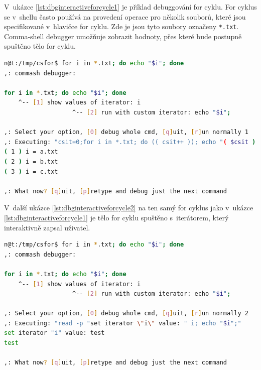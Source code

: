 \documentclass[thesis=M,czech]{FITthesis}[2012/06/26]
\begin{document}
V~ukázce \ref{lst:dbginteractiveforcycle1} je příklad debuggování for cyklu. For cyklus se v~shellu často používá na provedení operace pro několik souborů, které jsou specifikované v~hlavičce for cyklu. Zde je jsou tyto soubory označeny \texttt{*.txt}. Comma-shell debugger umožňuje zobrazit hodnoty, přes které bude postupně spuštěno tělo for cyklu.

\begin{minipage}{\linewidth}
\begin{lstlisting}[language=bash, caption={Debugger interaktivního shellu - výpis hodnot iterátoru for cyklu }, label={lst:dbginteractiveforcycle1}]
n@t:/tmp/csfor$ for i in *.txt; do echo "$i"; done
,: commash debugger:

for i in *.txt; do echo "$i"; done
    ^-- [1] show values of iterator: i
                   ^-- [2] run with custom iterator: echo "$i";

,: Select your option, [0] debug whole cmd, [q]uit, [r]un normally 1
,: Executing: "csit=0;for i in *.txt; do (( csit++ )); echo "( $csit ) i = $i"; done"
( 1 ) i = a.txt
( 2 ) i = b.txt
( 3 ) i = c.txt

,: What now? [q]uit, [p]retype and debug just the next command
\end{lstlisting}
\end{minipage}

V~další ukázce \ref{lst:dbginteractiveforcycle2} na ten samý for cyklus jako v~ukázce \ref{lst:dbginteractiveforcycle1} je tělo for cyklu spuštěno s~iterátorem, který interaktivně zapsal uživatel.

\begin{minipage}{\linewidth}
\begin{lstlisting}[language=bash, caption={Debugger interaktivního shellu - změna iterátoru for cyklu}, label={lst:dbginteractiveforcycle2}]
n@t:/tmp/csfor$ for i in *.txt; do echo "$i"; done
,: commash debugger:

for i in *.txt; do echo "$i"; done
    ^-- [1] show values of iterator: i
                   ^-- [2] run with custom iterator: echo "$i";

,: Select your option, [0] debug whole cmd, [q]uit, [r]un normally 2
,: Executing: "read -p "set iterator \"i\" value: " i; echo "$i";"
set iterator "i" value: test
test

,: What now? [q]uit, [p]retype and debug just the next command
\end{lstlisting}
\end{minipage}
\end{document}
